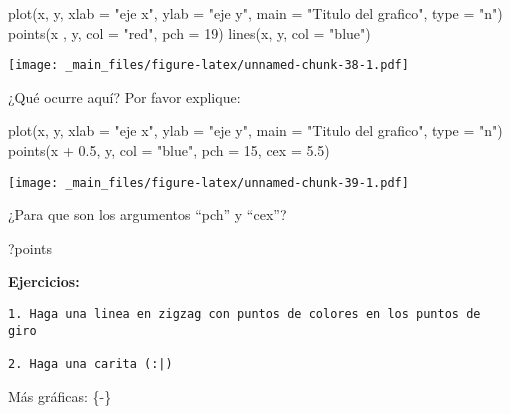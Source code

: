 \documentclass[
]{book}
\newenvironment{Shaded}{\begin{snugshade}}{\end{snugshade}}
\newcommand{\AttributeTok}[1]{\textcolor[rgb]{0.77,0.63,0.00}{#1}}
\newcommand{\DecValTok}[1]{\textcolor[rgb]{0.00,0.00,0.81}{#1}}
\newcommand{\FloatTok}[1]{\textcolor[rgb]{0.00,0.00,0.81}{#1}}
\newcommand{\FunctionTok}[1]{\textcolor[rgb]{0.00,0.00,0.00}{#1}}
\newcommand{\NormalTok}[1]{#1}
\newcommand{\SpecialCharTok}[1]{\textcolor[rgb]{0.00,0.00,0.00}{#1}}
\newcommand{\StringTok}[1]{\textcolor[rgb]{0.31,0.60,0.02}{#1}}
\begin{document}
\begin{Shaded}
\begin{Highlighting}[]
\FunctionTok{plot}\NormalTok{(x, y, }\AttributeTok{xlab =} \StringTok{"eje x"}\NormalTok{, }\AttributeTok{ylab =} \StringTok{"eje y"}\NormalTok{, }\AttributeTok{main =} \StringTok{"Titulo del grafico"}\NormalTok{, }\AttributeTok{type =} \StringTok{"n"}\NormalTok{)}
\FunctionTok{points}\NormalTok{(x , y, }\AttributeTok{col =} \StringTok{"red"}\NormalTok{, }\AttributeTok{pch =} \DecValTok{19}\NormalTok{)}
\FunctionTok{lines}\NormalTok{(x, y, }\AttributeTok{col =} \StringTok{"blue"}\NormalTok{)}
\end{Highlighting}
\end{Shaded}

\texttt{[image: \_main\_files/figure-latex/unnamed-chunk-38-1.pdf]}

¿Qué ocurre aquí? Por favor explique:

\begin{Shaded}
\begin{Highlighting}[]
\FunctionTok{plot}\NormalTok{(x, y, }\AttributeTok{xlab =} \StringTok{"eje x"}\NormalTok{, }\AttributeTok{ylab =} \StringTok{"eje y"}\NormalTok{, }\AttributeTok{main =} \StringTok{"Titulo del grafico"}\NormalTok{, }\AttributeTok{type =} \StringTok{"n"}\NormalTok{)}
\FunctionTok{points}\NormalTok{(x }\SpecialCharTok{+} \FloatTok{0.5}\NormalTok{, y, }\AttributeTok{col =} \StringTok{"blue"}\NormalTok{, }\AttributeTok{pch =} \DecValTok{15}\NormalTok{, }\AttributeTok{cex =} \FloatTok{5.5}\NormalTok{) }
\end{Highlighting}
\end{Shaded}

\texttt{[image: \_main\_files/figure-latex/unnamed-chunk-39-1.pdf]}

¿Para que son los argumentos ``pch'' y ``cex''?

?points

\textbf{Ejercicios:}

\begin{verbatim}
1. Haga una linea en zigzag con puntos de colores en los puntos de giro

2. Haga una carita (:|)
\end{verbatim}

Más gráficas: \{-\}
\end{document}
